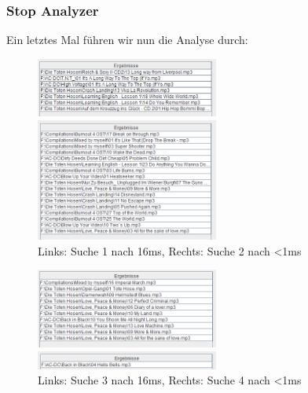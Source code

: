 \documentclass[12pt,a4paper,ngerman]{report}
\begin{document}
\subsubsection*{Stop Analyzer}
Ein letztes Mal führen wir nun die Analyse durch:
\begin{figure}[h!]
\centering
	\begin{minipage}[b]{7cm}
	\includegraphics[width=6cm]{img/search1_stoAn_16.PNG}
	\end{minipage}
	\begin{minipage}[b]{7cm}
	\includegraphics[width=6cm]{img/search2_stoAn_0.PNG}
	\end{minipage}
\caption{Links: Suche 1 nach 16ms, Rechts: Suche 2 nach \textless 1ms\protect\footnotemark}
\end{figure}
\begin{figure}[h!]
\centering
	\begin{minipage}[b]{7cm}
	\includegraphics[width=6cm]{img/search3_stoAn_16.PNG}
	\end{minipage}
	\begin{minipage}[b]{7cm}
	\includegraphics[width=6cm]{img/search4_stoAn_0.PNG}
	\end{minipage}
\caption{Links: Suche 3 nach 16ms, Rechts: Suche 4 nach \textless 1ms\protect\footnotemark}
\end{figure}
\end{document}
